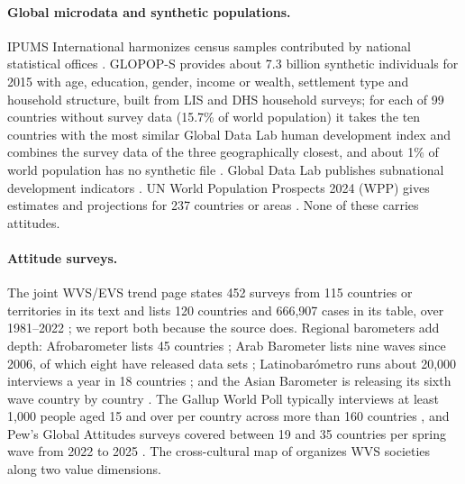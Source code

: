 \documentclass[10pt]{article}
\begin{document}
\paragraph{Global microdata and synthetic populations.} IPUMS International harmonizes census samples contributed by national statistical offices \citep{ipums2025,ipumshome}. GLOPOP-S provides about 7.3 billion synthetic individuals for 2015 with age, education, gender, income or wealth, settlement type and household structure, built from LIS and DHS household surveys; for each of 99 countries without survey data (15.7\% of world population) it takes the ten countries with the most similar Global Data Lab human development index and combines the survey data of the three geographically closest, and about 1\% of world population has no synthetic file \citep{ton2024glopop}. Global Data Lab publishes subnational development indicators \citep{smits2019shdi}. UN World Population Prospects 2024 (WPP) gives estimates and projections for 237 countries or areas \citep{wpp2024}. None of these carries attitudes.

\paragraph{Attitude surveys.} The joint WVS/EVS trend page states 452 surveys from 115 countries or territories in its text and lists 120 countries and 666,907 cases in its table, over 1981--2022 \citep{haerpfer2022wvs,evs2022trend}; we report both because the source does. Regional barometers add depth: Afrobarometer lists 45 countries \citep{afrobarometer}; Arab Barometer lists nine waves since 2006, of which eight have released data sets \citep{arabbarometer}; Latinobarómetro runs about 20,000 interviews a year in 18 countries \citep{latinobarometro}; and the Asian Barometer is releasing its sixth wave country by country \citep{asianbarometer}. The Gallup World Poll typically interviews at least 1,000 people aged 15 and over per country across more than 160 countries \citep{gallupwp}, and Pew's Global Attitudes surveys covered between 19 and 35 countries per spring wave from 2022 to 2025 \citep{pewdatasets}. The cross-cultural map of \citet{inglehart2005} organizes WVS societies along two value dimensions.
\end{document}
